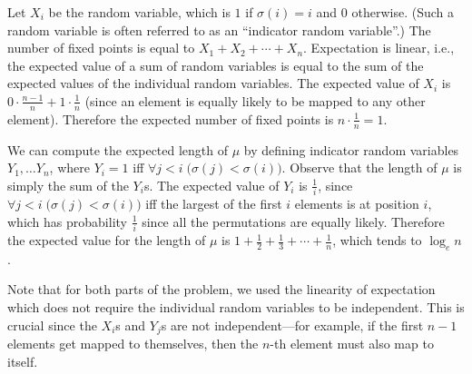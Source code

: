 Let $X_i$ be the random variable, which is $1$ if $\sigma(i) = i$
and $0$ otherwise. (Such a random variable is often referred to as an ``indicator random variable''.) The number of fixed points is equal to $X_1 + X_2 + \cdots + X_n$. Expectation is linear, i.e., the expected value 
of a sum of random variables is equal to the sum
of the expected values of the individual random variables. The
expected value of $X_i$ is $0 \cdot \frac{n-1}{n} + 1 \cdot \frac{1}{n}$ (since
an element is equally likely to be mapped to any other element).
Therefore the expected number of fixed points is $n \cdot \frac{1}{n} = 1$.

We can compute the expected length of $\mu$ by defining
indicator random variables $Y_1,\ldots Y_n$, where $Y_i = 1$ iff
$\forall j < i \; \big(\sigma(j) < \sigma(i)\big)$.
Observe that the length of $\mu$ is simply the sum of the $Y_i$s.
The expected value of $Y_i$ is $\frac{1}{i}$, since $\forall j < i \; \big(\sigma(j) < \sigma(i)\big)$
iff the largest of the first $i$ elements is at position $i$, which
has probability $\frac{1}{i}$ since all the permutations are equally likely.
Therefore the expected value for the length of $\mu$ is $1 + \frac{1}{2} + \frac{1}{3} + \cdots + \frac{1}{n}$, which tends to $\log_e n$.

Note that for both parts of the problem, we used the linearity
of expectation which does not require the individual random variables
to be independent.  This is crucial since the $X_i$s and $Y_j$s
are not independent---for example, if the first $n-1$ elements get mapped
to themselves, then the $n$-th element must also map to itself.


